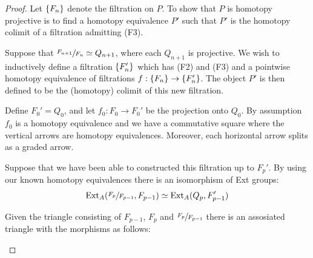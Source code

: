 \documentclass[../thesis.tex]{subfiles}
\begin{document}
            \begin{proof}
                Let $\{F_n\}$ denote the filtration on $P$. To show that $P$ is homotopy projective is to find a homotopy equivalence $P'$ such that $P'$ is the homotopy colimit of a filtration admitting (F3).

                Suppose that $\sfrac{F_{n+1}}{F_n}\simeq Q_{n+1}$, where each $Q_{n+1}$ is projective. We wish to inductively define a filtration $\{F_n'\}$ which has (F2) and (F3) and a pointwise homotopy equivalence of filtrations $f : \{F_n\} \rightarrow \{F_n'\}$. The object $P'$ is then defined to be the (homotopy) colimit of this new filtration.
                
                Define $F_0' = Q_0$, and let $f_0 : F_0 \rightarrow F_0'$ be the projection onto $Q_0$. By assumption $f_0$ is a homotopy equivalence and we have a commutative square where the vertical arrows are homotopy equivalences. Moreover, each horizontal arrow splits as a graded arrow.

                \begin{center}
                \end{center}

                Suppose that we have been able to constructed this filtration up to $F_p'$. By using our known homotopy equivalences there is an isomorphism of Ext groups:
                \begin{align*}
                    \text{Ext}_A(\sfrac{F_{p}}{F_{p-1}}, F_{p-1})\simeq \text{Ext}_A(Q_p, F_{p-1}')
                \end{align*}

                Given the triangle consisting of $F_{p-1}$, $F_p$ and $\sfrac{F_p}{F_{p-1}}$ there is an assosiated triangle with the morphisms as follows:
                \begin{center}
                \end{center}


\end{proof}
\end{document}
